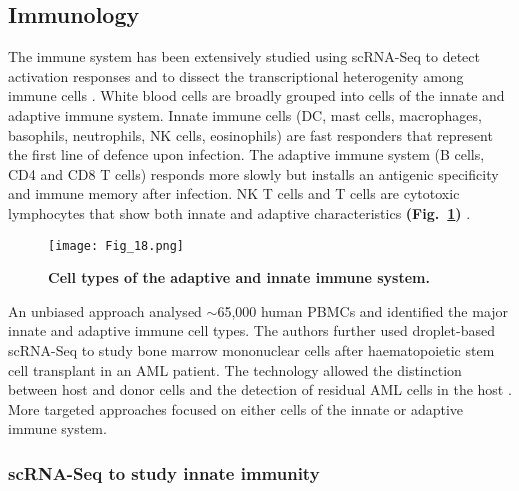 \subsection{Immunology}

The immune system has been extensively studied using scRNA-Seq to detect activation responses and to dissect the transcriptional heterogenity among immune cells \citep{Proserpio2015, Satija2014}. White blood cells are broadly grouped into cells of the innate and adaptive immune system. Innate immune cells (\gls{DC}, mast cells, macrophages, basophils, neutrophils, \gls{NK} cells, eosinophils) are fast responders that represent the first line of defence upon infection. The adaptive immune system (B cells, CD4\plus{} and CD8\plus{} T cells) responds more slowly but installs an antigenic specificity and immune memory after infection. \gls{NK} T cells and \textgamma{}\textdelta{} T cells are cytotoxic lymphocytes that show both innate and adaptive characteristics \textbf{(Fig.~\ref{fig0:immune_system})} \citep{Dranoff2004}. 

\begin{figure}[!h]
\centering
\texttt{[image: Fig\_18.png]}
\caption[Cell types of the adaptive and innate immune system]{\textbf{Cell types of the adaptive and innate immune system.}}
\label{fig0:immune_system}
\end{figure}

An unbiased approach analysed $\sim$65,000 human \glspl{PBMC} and identified the major innate and adaptive immune cell types. The authors further used droplet-based scRNA-Seq to study bone marrow mononuclear cells after haematopoietic stem cell transplant in an \gls{AML} patient. The technology allowed the distinction between host and donor cells and the detection of residual AML cells in the host \citep{Zheng2017}. \\

More targeted approaches focused on either cells of the innate or adaptive immune system.

\subsubsection{scRNA-Seq to study innate immunity}

